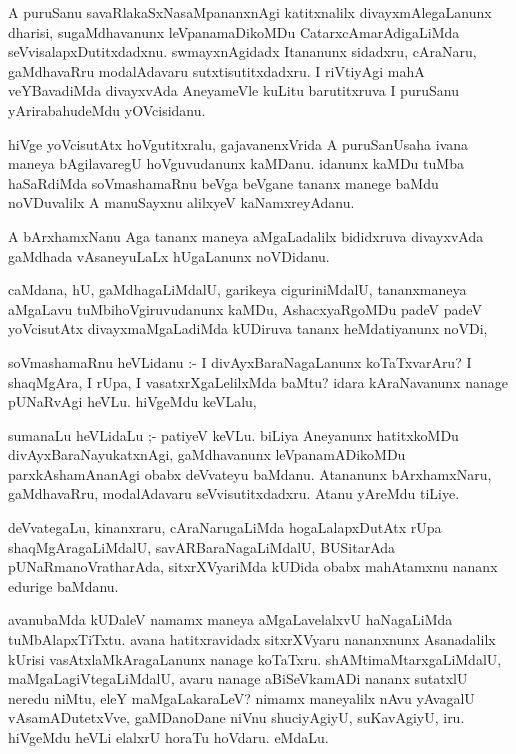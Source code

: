 \documentclass{article}
\begin{document}
\begin{mn}
A puruSanu savaRlakaSxNasaMpananxnAgi katitxnalilx divayxmAlegaLanunx dharisi, 
sugaMdhavanunx  leVpanamaDikoMDu CatarxcAmarAdigaLiMda seVvisalapxDutitxdadxnu. 
swmayxnAgidadx Itananunx sidadxru, cAraNaru, gaMdhavaRru modalAdavaru 
sutxtisutitxdadxru. I riVtiyAgi mahA veYBavadiMda divayxvAda AneyameVle 
kuLitu barutitxruva I puruSanu yArirabahudeMdu yOVcisidanu.
\end{mn}


\begin{mn}
hiVge yoVcisutAtx  hoVgutitxralu, gajavanenxVrida A puruSanUsaha ivana 
maneya bAgilavaregU hoVguvudanunx kaMDanu. idanunx kaMDu tuMba haSaRdiMda 
soVmashamaRnu beVga beVgane tananx manege baMdu noVDuvalilx A manuSayxnu 
alilxyeV kaNamxreyAdanu.
\end{mn}

\begin{mn}
A bArxhamxNanu Aga tananx maneya aMgaLadalilx bididxruva divayxvAda gaMdhada 
vAsaneyuLaLx hUgaLanunx noVDidanu.
\end{mn}

\begin{mn}
caMdana, hU, gaMdhagaLiMdalU, garikeya ciguriniMdalU, tananxmaneya aMgaLavu 
tuMbihoVgiruvudanunx kaMDu, AshacxyaRgoMDu padeV padeV yoVcisutAtx 
divayxmaMgaLadiMda kUDiruva tananx heMdatiyanunx noVDi, 
\end{mn}

\begin{mn}
soVmashamaRnu heVLidanu :- I divAyxBaraNagaLanunx koTaTxvarAru?  I shaqMgAra, 
I rUpa, I vasatxrXgaLelilxMda baMtu? idara kAraNavanunx nanage pUNaRvAgi 
heVLu. hiVgeMdu keVLalu,
\end{mn}

\begin{mn}
sumanaLu heVLidaLu ;- patiyeV keVLu. biLiya Aneyanunx hatitxkoMDu 
divAyxBaraNayukatxnAgi, gaMdhavanunx leVpanamADikoMDu parxkAshamAnanAgi 
obabx deVvateyu baMdanu. Atananunx  bArxhamxNaru, gaMdhavaRru, modalAdavaru 
seVvisutitxdadxru. Atanu yAreMdu tiLiye.
\end{mn}

\begin{mn}
deVvategaLu, kinanxraru, cAraNarugaLiMda hogaLalapxDutAtx rUpa shaqMgAragaLiMdalU, 
savARBaraNagaLiMdalU, BUSitarAda pUNaRmanoVratharAda, sitxrXVyariMda kUDida 
obabx mahAtamxnu nananx edurige baMdanu. 
\end{mn}

\begin{mn}
avanubaMda kUDaleV namamx maneya aMgaLavelalxvU haNagaLiMda tuMbAlapxTiTxtu.  
avana hatitxravidadx sitxrXVyaru nananxnunx Asanadalilx kUrisi vasAtxlaMkAragaLanunx 
nanage koTaTxru. shAMtimaMtarxgaLiMdalU,  maMgaLagiVtegaLiMdalU, avaru nanage 
aBiSeVkamADi nananx sutatxlU neredu niMtu, eleY maMgaLakaraLeV?  nimamx maneyalilx 
nAvu  yAvagalU vAsamADutetxVve, gaMDanoDane niVnu shuciyAgiyU, suKavAgiyU, 
iru. hiVgeMdu heVLi elalxrU horaTu hoVdaru. eMdaLu.
\end{mn}
\end{document}
